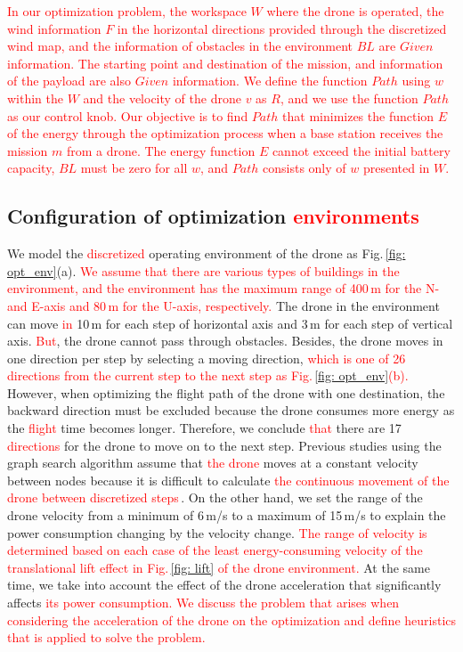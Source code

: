 \documentclass[journal]{./template/IEEEtran}
\begin{document}
\textcolor{red}{In our optimization problem, the workspace $W$ where the drone is operated, the wind information $F$ in the horizontal directions provided through the discretized wind map, and the information of obstacles in the environment $BL$ are $Given$ information.
The starting point and destination of the mission, and information of the payload are also $Given$ information.
We define the function $Path$ using $w$ within the $W$ and the velocity of the drone $v$ as $R$, and we use the function $Path$ as our control knob.
Our objective is to find $Path$ that minimizes the function $E$ of the energy through the optimization process when a base station receives the mission $m$ from a drone.
The energy function $E$ cannot exceed the initial battery capacity, $BL$ must be zero for all $w$, and $Path$ consists only of $w$ presented in $W$.}






\subsection{Configuration of optimization \textcolor{red}{environments}}
\label{sub_Section: configuration}

We model the \textcolor{red}{discretized} operating environment of the drone as Fig.\,\ref{fig: opt_env}(a).
\textcolor{red}{We assume that there are various types of buildings in the environment, and the environment has the maximum range of 400\,m for the N- and E-axis and 80\,m for the U-axis, respectively.}
The drone in the environment can move \textcolor{red}{in} 10\,m for each step of horizontal axis and 3\,m for each step of vertical axis. \textcolor{red}{But}, the drone cannot pass through obstacles.
Besides, the drone moves in one direction per step by selecting a moving direction, \textcolor{red}{which is one of 26 directions from the current step to the next step as Fig.\,\ref{fig: opt_env}(b).}
However, when optimizing the flight path of the drone with one destination, the backward direction must be excluded because the drone consumes more energy as the \textcolor{red}{flight} time becomes longer. Therefore, we conclude \textcolor{red}{that} there are 17 \textcolor{red}{directions} for the drone to move on to the next step.
Previous studies using the graph search algorithm assume that \textcolor{red}{the drone} moves at a constant velocity between nodes because it is difficult to calculate \textcolor{red}{the continuous movement of the drone between discretized steps}\,\cite{ref_8, ref_10, ref_22}. 
On the other hand, we set the range of the drone velocity from a minimum of 6\,m/s to a maximum of 15\,m/s to explain the power consumption changing by the velocity change. 
\textcolor{red}{The range of velocity is determined based on each case of the least energy-consuming velocity of the translational lift effect in Fig.\,\ref{fig: lift} of the drone environment.}
At the same time, we take into account the effect of the drone acceleration that significantly affects \textcolor{red}{its power consumption.
We discuss the problem that arises when considering the acceleration of the drone on the optimization and define heuristics that is applied to solve the problem.}
\end{document}
